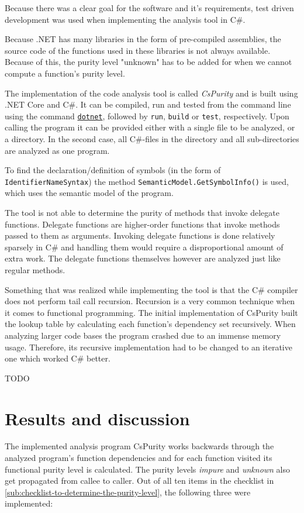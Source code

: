 \documentclass[a4paper,12pt]{article}
\begin{document}
Because there was a clear goal for the software and it's requirements, test driven development was used when implementing the analysis tool in C\#.

Because .NET has many libraries in the form of pre-compiled assemblies, the source code of the functions used in these libraries is not always available. Because of this, the purity level "unknown" has to be added for when we cannot compute a function's purity level.

The implementation of the code analysis tool is called \textit{CsPurity} and is built using .NET Core and C\#. It can be compiled, run and tested from the command line using the command \href{https://docs.microsoft.com/en-us/dotnet/core/tools/}{\texttt{dotnet}}, followed by \texttt{run}, \texttt{build} or \texttt{test}, respectively. Upon calling the program it can be provided either with a single file to be analyzed, or a directory. In the second case, all C\#-files in the directory and all sub-directories are analyzed as one program.

To find the declaration/definition of symbols (in the form of \texttt{IdentifierNameSyn\allowbreak tax}) the method \texttt{SemanticModel.GetSym\allowbreak bolInfo()} is used, which uses the semantic model of the program.

The tool is not able to determine the purity of methods that invoke delegate functions. Delegate functions are higher-order functions that invoke methods passed to them as arguments. Invoking delegate functions is done relatively sparsely in C\# and handling them would require a disproportional amount of extra work. The delegate functions themselves however are analyzed just like regular methods.

Something that was realized while implementing the tool is that the C\# compiler does not perform tail call recursion. Recursion is a very common technique when it comes to functional programming. The initial implementation of CsPurity built the lookup table by calculating each function's dependency set recursively. When analyzing larger code bases the program crashed due to an immense memory usage. Therefore, its recursive implementation had to be changed to an iterative one which worked C\# better.

TODO

\section{Results and discussion} \label{sec:results-and-discussion}
The implemented analysis program CsPurity works backwards through the analyzed program's function dependencies and for each function visited its functional purity level is calculated. The purity levels \textit{impure} and \textit{unknown} also get propagated from callee to caller. Out of all ten items in the checklist in \autoref{sub:checklist-to-determine-the-purity-level}, the following three were implemented:
\end{document}
